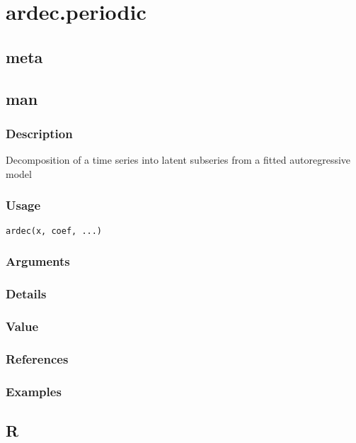 \documentclass[11pt]{article}
\begin{document}
\section{ardec.periodic}
\label{sec-3}
\subsection{meta}
\label{sec-3-1}
\subsection{man}
\label{sec-3-2}
\subsubsection{Description}
\label{sec-3-2-1}

Decomposition of a time series into latent subseries from a fitted
autoregressive model
\subsubsection{Usage}
\label{sec-3-2-2}

\begin{verbatim}
ardec(x, coef, ...)
\end{verbatim}
\subsubsection{Arguments}
\label{sec-3-2-3}
\subsubsection{Details}
\label{sec-3-2-4}
\subsubsection{Value}
\label{sec-3-2-5}
\subsubsection{References}
\label{sec-3-2-6}
\subsubsection{Examples}
\label{sec-3-2-7}

\subsection{R}
\label{sec-3-3}
\end{document}
